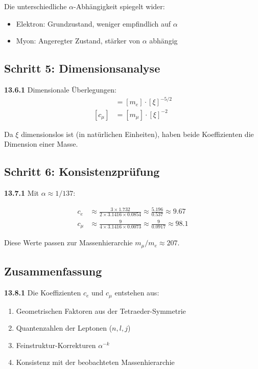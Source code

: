 \documentclass[12pt,a4paper]{article}
\begin{document}
Die unterschiedliche $\alpha$-Abhängigkeit spiegelt wider:
\begin{itemize}
	\item Elektron: Grundzustand, weniger empfindlich auf $\alpha$
	\item Myon: Angeregter Zustand, stärker von $\alpha$ abhängig
\end{itemize}

\subsection{Schritt 5: Dimensionsanalyse}

\noindent \textbf{13.6.1} Dimensionale Überlegungen:
\begin{align*}
	[c_e] &= [m_e] \cdot [\xi]^{-5/2} \\
	[c_\mu] &= [m_\mu] \cdot [\xi]^{-2}
\end{align*}

Da $\xi$ dimensionslos ist (in natürlichen Einheiten), haben beide Koeffizienten die Dimension einer Masse.

\subsection{Schritt 6: Konsistenzprüfung}

\noindent \textbf{13.7.1} Mit $\alpha \approx 1/137$:

\begin{align*}
	c_e &\approx \frac{3 \times 1.732}{2 \times 3.1416 \times 0.0854} \approx \frac{5.196}{0.537} \approx 9.67 \\
	c_\mu &\approx \frac{9}{4 \times 3.1416 \times 0.0073} \approx \frac{9}{0.0917} \approx 98.1
\end{align*}

Diese Werte passen zur Massenhierarchie $m_\mu/m_e \approx 207$.

\subsection{Zusammenfassung}

\noindent \textbf{13.8.1} Die Koeffizienten $c_e$ und $c_\mu$ entstehen aus:
\begin{enumerate}
	\item Geometrischen Faktoren aus der Tetraeder-Symmetrie
	\item Quantenzahlen der Leptonen ($n,l,j$)
	\item Feinstruktur-Korrekturen $\alpha^{-k}$
	\item Konsistenz mit der beobachteten Massenhierarchie
\end{enumerate}
\end{document}

